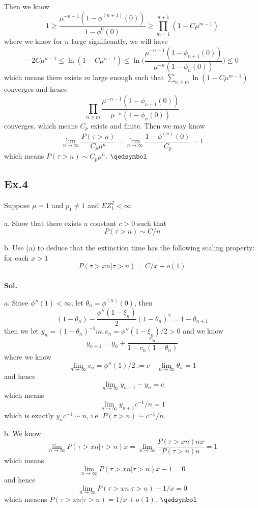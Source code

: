 \documentclass[lang=en,11pt,a4paper,citestyle =authoryear]{elegantpaper}
\newcommand{\prvd}{$\hfill \qedsymbol$}
\begin{document}
Then we know
\[ 1\geq \dfrac{\mu^{-n-1}(1-\phi^{(n+1)}(0))}{1-\phi^0(0)} \geq \prod_{m = 1}^{n+1}(1-C\mu^{m-1})\]
where we know for $n$ large significantly, we will have
\[
-2C\mu^{n-1} \leq \ln(1-C\mu^{n-1}) \leq  \ln\Big(\dfrac{\mu^{-n-1}(1-\phi_{n+1}(0))}{\mu^{-n}(1-\phi_n(0))}\Big) \leq 0
\]
which means there exists $m$ large enough such that $\sum\limits_{n\geq m}  \ln(1-C\mu^{m-1})$ converges and hence \[\prod_{n\geq m} \dfrac{\mu^{-n-1}(1-\phi_{n+1}(0))}{\mu^{-n}(1-\phi_n(0))}\] converges, which means $C_p$ exists and finite. Then we may know
\[
\lim_{n\to\infty} \dfrac{P(\tau > n)}{C_p \mu^n} =\lim_{n\to\infty} \dfrac{1-\phi^{(n)}(0)}{C_p} = 1
\]
which means $P(\tau > n) \sim C_p \mu^n$.
\prvd
\vspace{0.5em}

\subsection*{Ex.4} 
Suppose $\mu = 1$ and $p_1 \neq 1$ and $EZ_1^2 < \infty$.\par
a. Show that there exists a constant $c>0$ such that
\[P(\tau>n) \sim C/n\]\par
b. Use (a) to deduce that the extinction time has the following scaling property: for each $x>1$
\[P(\tau>xn|\tau>n) = C/x + o(1)\]
\vspace{0.5em}\\
\textbf{Sol.} \par
a. Since $\phi''(1) < \infty$, let $\theta_n = \phi^{(n)}(0)$, then
\[
(1-\theta_n) - \dfrac{\phi''(1-\xi_n)}{2}(1-\theta_n)^2 = 1-\theta_{n+1}
\]
then we let $y_n = (1-\theta_n)^{-1}m, c_n=\phi''(1-\xi_n)/2 > 0$ and we know
\[
y_{n+1} = y_n+\dfrac{c_n}{1-c_n(1-\theta_n)}
\]
where we know
\[
\lim_{n\to\infty} c_n = \phi''(1)/2 := c\quad \lim_{n\to\infty} \theta_n = 1
\]
and hence
\[
\lim_{n\to\infty} y_{n+1}-y_n = c
\]
which means
\[
\lim_{n\to\infty} y_{n+1}c^{-1}/n = 1
\]
which is exactly $y_{n}c^{-1} \sim n$, i.e. $P(\tau>n) \sim c^{-1}/n$.\par
b. We know
\[
\lim_{n\to\infty} P(\tau>xn|\tau >n)x = \lim_{n\to\infty} \dfrac{P(\tau>xn)nx}{P(\tau>n)n} = 1
\]
which means
\[
\lim_{n\to\infty} P(\tau>xn|\tau >n)x - 1 =0
\]
and hence
\[
\lim_{n\to\infty} P(\tau>xn|\tau >n) - 1/x = 0
\]
which meaens $P(\tau>xn|\tau >n) = 1/x + o(1)$.
\prvd
\vspace{0.5em}
\end{document}
